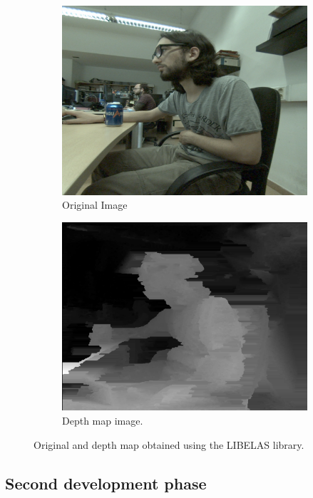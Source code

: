 \documentclass[10pt,a4paper,twocolumn,twoside]{article}
\begin{document}
	\begin{figure}
		\centering
		\begin{subfigure}[b]{1\linewidth}
			\includegraphics[width=\linewidth]{img/4}
			\caption{Original Image}
		\end{subfigure}
		\begin{subfigure}[b]{1\linewidth}
			\includegraphics[width=\linewidth]{img/4b}
			\caption{Depth map image.}
		\end{subfigure}
		\caption{Original and depth map obtained using the LIBELAS library.}
		\label{fig:depthmap}
	\end{figure}
	
	\subsection{Second development phase}
	
\end{document}
